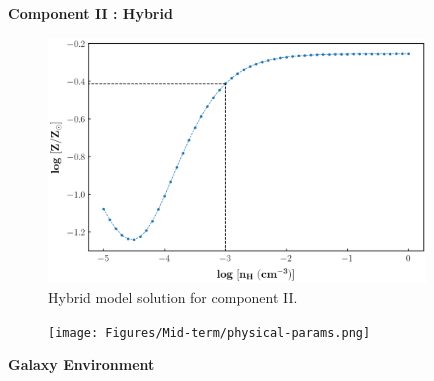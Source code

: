 \documentclass[aspectratio=169]{beamer}
\begin{document}
\begin{markdown}
\begin{frame}{\textbf{Component II : Hybrid}}
\end{frame}

\begin{frame}{} 

\begin{figure}[!htbp]
          \centering
          \includegraphics[width=10cm]{Figures/Mid-term/comp-II-CIE.png}
          \vspace*{-1mm}
          \caption{Hybrid model solution for component II.}
\end{figure}


\end{frame}

\begin{frame}[noframenumbering]{} 

\begin{figure}[!htbp]
          \centering
          \texttt{[image: Figures/Mid-term/physical-params.png]}
\end{figure}


\end{frame}


\begin{frame}{\huge{{\textbf{Galaxy Environment}}}}


\end{frame}
\end{markdown}
\end{document}
